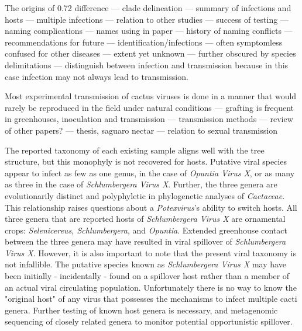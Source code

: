 \documentclass[fleqn,10pt,lineno]{wlpeerj}
\begin{document}
The origins of 0.72 difference --- clade delineation --- summary of infections and hosts --- multiple infections --- relation to other studies --- success of testing --- naming complications --- names using in paper --- history of naming conflicts --- recommendations for future --- identification/infections --- often symptomless confused for other diseases --- extent yet unknown --- further obscured by species delimitations --- distinguish between infection and transmission because in this case infection may not always lead to transmission. 

Most experimental transmission of cactus viruses is done in a manner that would rarely be reproduced in the field under natural conditions --- grafting  is frequent in greenhouses, inoculation and transmission --- transmission methods --- review of other papers? --- thesis, saguaro nectar --- relation to sexual transmission
 
The reported taxonomy of each existing sample aligns well with the tree structure, but this monophyly is not recovered for hosts.
Putative viral species appear to infect as few as one genus, in the case of \textit{Opuntia Virus X}, or as many as three in the case of \textit{Schlumbergera Virus X}.
Further, the three genera are evolutionarily distinct and polyphyletic in phylogenetic analyses of \textit{Cactaceae}. 
This relationship raises questions about a \textit{Potexvirus}'s ability to switch hosts. %
All three genera that are reported hosts of \textit{Schlumbergera Virus X} are ornamental crops: \textit{Selenicereus, Schlumbergera}, and \textit{Opuntia}.
Extended greenhouse contact between the three genera may have resulted in viral spillover of \textit{Schlumbergera Virus X}.
However, it is also important to note that the present viral taxonomy is not infallible. 
The putative species known as \textit{Schlumbergera Virus X} may have been initially - incidentally - found on a spillover host rather than a member of an actual viral circulating population.
Unfortunately there is no way to know the "original host" of any virus that possesses the mechanisms to infect multiple cacti genera. 
Further testing of known host genera is necessary, and metagenomic sequencing of closely related genera to monitor potential opportunistic spillover. 
\end{document}
